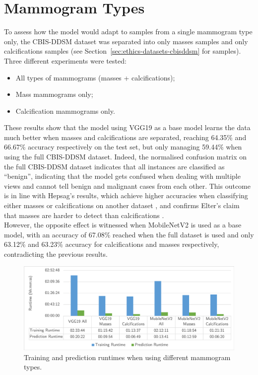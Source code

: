 
\section{Mammogram Types}

To assess how the model would adapt to samples from a single mammogram type only, the CBIS-DDSM dataset was separated into only masses samples and only calcifications samples (see Section~\ref{sec:ethics-datasets-cbisddsm} for samples). Three different experiments were tested:
\begin{itemize}
    \item All types of mammograms (masses + calcifications);
    \item Mass mammograms only;
    \item Calcification mammograms only.
\end{itemize}



These results show that the model using VGG19 as a base model learns the data much better when masses and calcifications are separated, reaching 64.35\% and 66.67\% accuracy respectively on the test set, but only managing 59.44\% when using the full CBIS-DDSM dataset. Indeed, the normalised confusion matrix on the full CBIS-DDSM dataset indicates that all instances are classified as ``benign'', indicating that the model gets confused when dealing with multiple views and cannot tell benign and malignant cases from each other. This outcome is in line with Hepsag's results, which achieve higher accuracies when classifying either masses or calcifications on another dataset \citep{Hepsag2017}, and confirms Elter's claim that masses are harder to detect than calcifications \citep{Elter2009}.\\

However, the opposite effect is witnessed when MobileNetV2 is used as a base model, with an accuracy of 67.08\% reached when the full dataset is used and only 63.12\% and 63.23\% accuracy for calcifications and masses respectively, contradicting the previous results.

\begin{figure}[ht]
\centerline{\includegraphics[width=\textwidth]{figures/evaluation/mammogram_type_experiment/runtimes.png}}
\caption{\label{fig:evaluation-mammogram_type_experiment-runtimes.png}Training and prediction runtimes when using different mammogram types.}
\end{figure}

